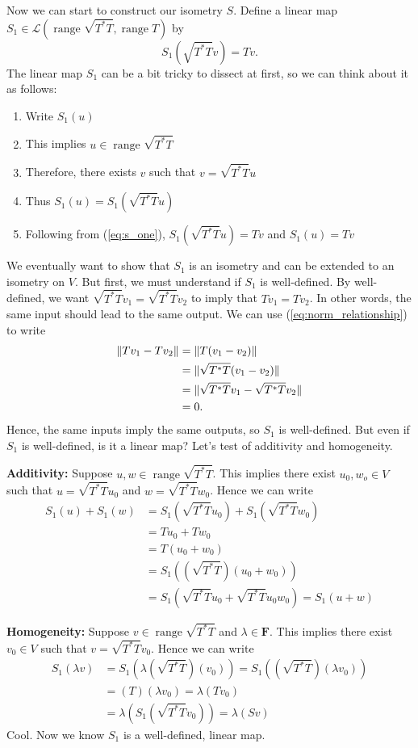 \documentclass{article}
\begin{document}
Now we can start to construct our isometry $S$. Define a linear map $S_1\in\mathcal{L}(\operatorname{range}\sqrt{T^*T},\operatorname{range}T)$ by
\begin{equation}\label{eq:s_one}
    S_1(\sqrt{T^*T}v)=Tv.
\end{equation}
The linear map $S_1$ can be a bit tricky to dissect at first, so we can think about it as follows:
\begin{enumerate}
    \item Write $S_1(u)$
    \item This implies $u\in\operatorname{range}\sqrt{T^*T}$
    \item Therefore, there exists $v$ such that $v = \sqrt{T^*T}u$
    \item Thus $S_1(u)=S_1(\sqrt{T^*T}u)$
    \item Following from (\ref{eq:s_one}), $S_1(\sqrt{T^*T}u)=Tv$ and $S_1(u)=Tv$
\end{enumerate}
We eventually want to show that $S_1$ is an isometry and can be extended to an isometry on $V$. But first, we must understand if $S_1$ is well-defined. By well-defined, we want $\sqrt{T^*T}v_1=\sqrt{T^*T}v_2$ to imply that $Tv_1=Tv_2$. In other words, the same input should lead to the same output. We can use (\ref{eq:norm_relationship}) to write
\begin{align*}
    \lVert Tv_1-Tv_2\rVert&=\lVert T(v_1-v_2)\rVert\\
    &=\lVert\sqrt{T^*T}(v_1-v_2)\rVert \\
    &=\lVert\sqrt{T^*T}v_1-\sqrt{T^*T}v_2\rVert\\
    &=0.
\end{align*}
Hence, the same inputs imply the same outputs, so $S_1$ is well-defined. But even if $S_1$ is well-defined, is it a linear map? Let's test of additivity and homogeneity.

\textbf{Additivity:} Suppose $u,w\in\operatorname{range}\sqrt{T^*T}$. This implies there exist $u_0,w_o\in V$ such that $u=\sqrt{T^*T}u_0$ and $w=\sqrt{T^*T}w_0$. Hence we can write
\begin{align*}
    S_1(u)+S_1(w)&=S_1(\sqrt{T^*T}u_0) + S_1(\sqrt{T^*T}w_0)\\
    &= Tu_0+Tw_0 \\
    &= T(u_0+w_0) \\
    &= S_1((\sqrt{T^*T})(u_0+w_0))\\
    &=S_1(\sqrt{T^*T}u_0+\sqrt{T^*T}u_0w_0)=S_1(u+w)
\end{align*}

\textbf{Homogeneity:} Suppose $v\in\operatorname{range}\sqrt{T^*T}$ and $\lambda\in\mathbf{F}$. This implies there exist $v_0\in V$ such that $v=\sqrt{T^*T}v_0$. Hence we can write
\begin{align*}
    S_1(\lambda v)&=S_1(\lambda (\sqrt{T^*T})(v_0))=S_1((\sqrt{T^*T})(\lambda v_0))\\
    &=(T)(\lambda v_0)=\lambda(Tv_0)\\
    &=\lambda(S_1(\sqrt{T^*T}v_0))=\lambda(Sv)
\end{align*}
Cool. Now we know $S_1$ is a well-defined, linear map.
\end{document}

